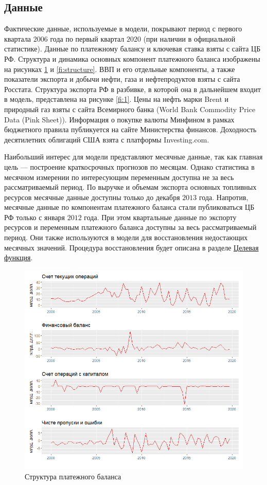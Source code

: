 \documentclass[a4paper, 14pt]{extarticle}
\begin{document}
\subsection{Данные}\label{sub:data}
Фактические данные, используемые в модели, покрывают период с первого квартала $2006$ года по первый квартал $2020$ (при наличии в официальной статистике).
Данные по платежному балансу и ключевая ставка взяты с сайта ЦБ РФ. 
Структура и динамика основных компонент платежного баланса изображены на рисунках  \ref{fi:structure_other} и \ref{fi:structure}.
ВВП и его отдельные компоненты, а также показатели экспорта и добычи нефти, газа и нефтепродуктов взяты с сайта Росстата.
Структура экспорта РФ в разбивке, в которой она в дальнейшем входит в модель, представлена на рисунке \ref{fi:1}.
Цены на нефть марки Brent и природный газ взяты с сайта Всемирного банка (World Bank Commodity Price Data (Pink Sheet)).
Информация о покупке валюты Минфином в рамках бюджетного правила публикуется на сайте Министерства финансов.
Доходность десятилетних облигаций США взята с платформы Investing.com.

Наибольший интерес для модели представляют месячные данные, так как главная цель — построение краткосрочных прогнозов по месяцам. 
Однако статистика в месячном измерении по интересующим переменным доступна не за весь рассматриваемый период.
По выручке и объемам экспорта основных топливных ресурсов месячные данные доступны только до декабря $2013$ года. 
Напротив, месячные данные по компонентам платежного баланса стали публиковаться ЦБ РФ только с января $2012$ года.
При этом квартальные данные по экспорту ресурсов и переменным платежного баланса доступны за весь рассматриваемый период.
Они также используются в модели для восстановления недостающих месячных значений.
Процедура восстановления будет описана в разделе \hyperref[sub:costfunction]{Целевая функция}.


\begin{figure}[htp!]
	\centering
	\includegraphics[width=\linewidth]{bal_str.png}
	\captionsetup{justification=centering,margin=0.5cm}
	\caption{Структура платежного баланса}\label{fi:structure_other}
\end{figure}
\end{document}
